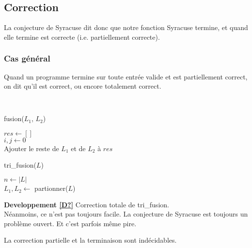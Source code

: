 \subsection{Correction}

La conjecture de Syracuse dit donc que notre fonction Syracuse termine, et quand elle termine est correcte (i.e. partiellement correcte).

\subsubsection{Cas général}

\begin{definition}
	Quand un programme termine sur toute entrée valide et est partiellement correct, on dit qu'il est correct, ou encore totalement correct.
\end{definition}

\begin{example}\enspace\\
	\begin{algorithm}[H]
		\caption{fusion($L_1$, $L_2$)}
		$res \gets []$\\
		$i,j \gets 0$\\
		Ajouter le reste de $L_1$ et de $L_2$ à $res$\\
	\end{algorithm}

	\begin{algorithm}[H]
		\caption{tri\_fusion($L$)}
		$n \gets |L|$\\
		$L_1, L_2 \gets$ partionner($L$)\\
	\end{algorithm}
\end{example}

\textbf{Developpement \ref{D?}} Correction totale de tri\_fusion.\\

Néanmoins, ce n'est pas toujours facile. La conjecture de Syracuse est toujours un problème ouvert. Et c'est parfois même pire.

\begin{theorem}
	La correction partielle et la terminaison sont indécidables. \label{1-6}
\end{theorem}

